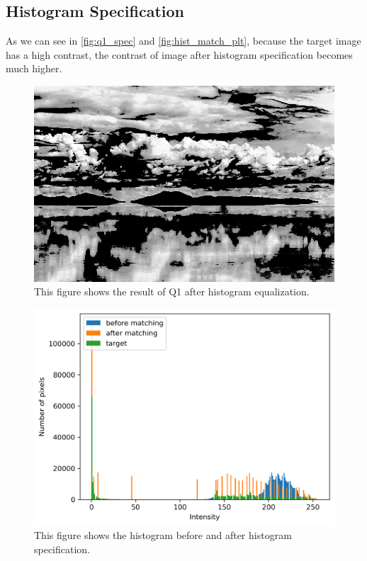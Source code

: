 \documentclass[twocolumn]{extarticle}
\begin{document}
\subsection{Histogram Specification}

As we can see in \autoref{fig:q1_spec} and \autoref{fig:hist_match_plt}, because the target image has a high contrast, the contrast of image after histogram specification becomes much higher. 

\begin{figure}[H]
\centering
\includegraphics[width=0.9\linewidth]{figure/Q1_spec}
\caption{This figure shows the result of Q1 after histogram equalization.}
\label{fig:q1_spec}
\end{figure}

\begin{figure}[H]
\centering
\includegraphics[width=0.9\linewidth]{figure/hist_match_plt}
\caption{This figure shows the histogram before and after histogram specification.}
\label{fig:hist_match_plt}
\end{figure}
\end{document}
